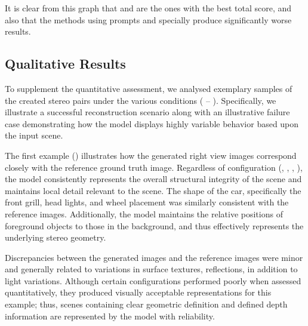 It is clear from this graph that  and  are the ones with the best total score, and also that the methods using prompts and specially  produce significantly worse results.


\subsection{Qualitative Results}
To supplement the quantitative assessment, we analysed exemplary samples of the created stereo pairs under the various conditions ( – ). Specifically, we illustrate a successful reconstruction scenario along with an illustrative failure case demonstrating how the model displays highly variable behavior based upon the input scene.

The first example () illustrates how the generated right view images correspond closely with the reference ground truth image. Regardless of configuration (, , , ), the model consistently represents the overall structural integrity of the scene and maintains local detail relevant to the scene. The shape of the car, specifically the front grill, head lights, and wheel placement was similarly consistent with the reference images. Additionally, the model maintains the relative positions of foreground objects to those in the background, and thus effectively represents the underlying stereo geometry.

Discrepancies between the generated images and the reference images were minor and generally related to variations in surface textures, reflections, in addition to light variations. Although certain configurations performed poorly when assessed quantitatively, they produced visually acceptable representations for this example; thus, scenes containing clear geometric definition and defined depth information are represented by the model with reliability.

